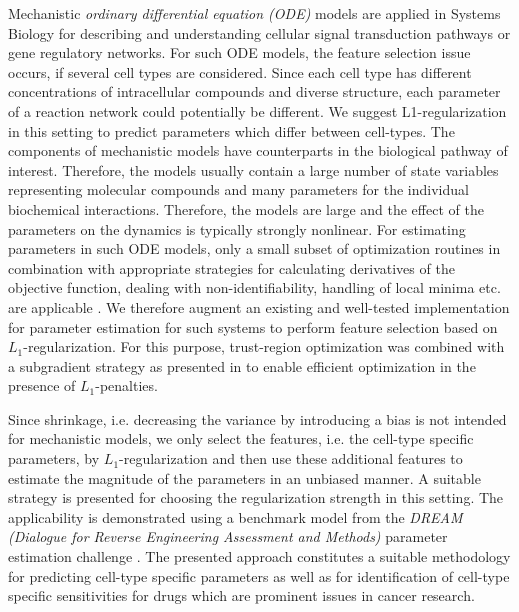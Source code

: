 \documentclass{bioinfo}
\begin{document}
Mechanistic  \emph{ordinary differential equation (ODE)} models are applied in Systems Biology for describing and understanding cellular signal transduction pathways or gene regulatory networks. 
For such ODE models, the feature selection issue occurs, if several cell types are considered. 
Since each cell type has different concentrations of intracellular compounds and diverse structure, each parameter of a reaction network could potentially be different. 
We suggest L1-regularization in this setting to predict parameters which differ between cell-types.
The components of mechanistic models have counterparts in the biological pathway of interest. 
Therefore, the models usually contain a large number of state variables representing molecular compounds and many parameters for the individual biochemical interactions. 
Therefore, the models are large and the effect of the parameters on the dynamics is typically strongly nonlinear. 
For estimating parameters in such ODE models, only a small subset of optimization routines in combination with appropriate strategies for calculating derivatives of the objective function, dealing with non-identifiability, handling of local minima etc. are applicable \citep{Raue2013}. 
We therefore augment an existing and well-tested implementation for parameter estimation for such systems \citep{Raue2015} to perform feature selection based on $L_1$-regularization. 
For this purpose, trust-region optimization \citep{Coleman96} was combined with a subgradient strategy as presented in \citep{Schmidt09} to enable efficient optimization in the presence of $L_1$-penalties. %

Since shrinkage, i.e. decreasing the variance by introducing a bias is not intended for mechanistic models, we only select the features, i.e. the cell-type specific parameters, by $L_1$-regularization and then use these additional features to estimate the magnitude of the parameters in an unbiased manner. 
A suitable strategy is presented for choosing the regularization strength in this setting. 
The applicability is demonstrated using a benchmark model from the \emph{DREAM (Dialogue for Reverse Engineering Assessment and Methods)} parameter estimation challenge \citep{Steiert12}. 
The presented approach constitutes a suitable methodology for predicting cell-type specific parameters as well as for identification of cell-type specific sensitivities for drugs which are prominent issues in cancer research. %
\end{document}

